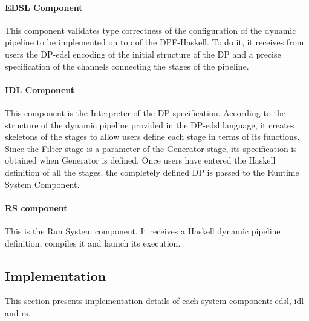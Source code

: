 \paragraph{EDSL Component} This component validates type correctness of the configuration of  the dynamic pipeline to be implemented on top of the  DPF-Haskell.  To do it, it receives from users the DP-\acrshort{edsl} encoding of the initial structure of the DP and a precise specification of the channels connecting the stages of the pipeline. 
%
\paragraph{IDL Component} This component is the Interpreter of the DP specification. According to the structure of the dynamic pipeline provided in the DP-\acrshort{edsl} language, it creates skeletons of the  stages to allow users define each stage in terms of its functions.  Since the Filter stage
is a parameter of the Generator stage, its specification is obtained when Generator is defined. Once users have entered  the Haskell definition of all the stages, the completely defined DP is passed to the Runtime System Component.
%
\paragraph{RS component} This is the Run System component. It receives a Haskell dynamic pipeline definition, compiles it and launch its execution. 
%
\iffalse
\begin{figure}[!ht]
  \centering
   \texttt{[image: dpf\_haskell\_v4.png]}
    \caption[{[\acrshort{dpfh}] System Architecture of the \acrshort{dpfh}}]{This diagram shows the system architecture of \acrshort{dpfh}. \acrshort{dpfh} is a \acrshort{dsl} which is built on three main components: \acrshort{dsl}, \acrshort{idl} and \acrshort{rs}. In the \acrshort{dsl} we can see how users can compose the main stages of the \acrshort{dp}. \acrshort{idl} is showing how the frameworks is helping users to transform that definition into real function or computations. Finally, \acrshort{rs} execute all that definition plus functions. Execution layer indicates an example of a \acrshort{dp} running after being executed.}
    \label{fig:dpfh:1}
\end{figure}
%
\fi
\subsection{Implementation}
This section presents 
implementation details of each system component: \acrshort{edsl}, \acrshort{idl} and \acrshort{rs}. 

